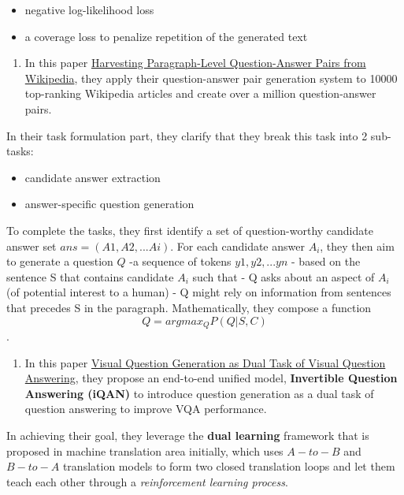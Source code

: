 \documentclass{acm_proc_article-sp}
\providecommand{\tightlist}{%
  \setlength{\itemsep}{0pt}\setlength{\parskip}{0pt}}
\begin{document}
\begin{itemize}
\tightlist
\item
  negative log-likelihood loss
\item
  a coverage loss to penalize repetition of the generated text
\end{itemize}

\begin{enumerate}
\def\labelenumi{\arabic{enumi}.}
\setcounter{enumi}{1}
\tightlist
\item
  In this paper \href{https://arxiv.org/pdf/1805.05942.pdf}{Harvesting
  Paragraph-Level Question-Answer Pairs from Wikipedia}, they apply
  their question-answer pair generation system to 10000 top-ranking
  Wikipedia articles and create over a million question-answer pairs.
\end{enumerate}

In their task formulation part, they clarify that they break this task
into 2 sub-tasks:

\begin{itemize}
\tightlist
\item
  candidate answer extraction
\item
  answer-specific question generation
\end{itemize}

To complete the tasks, they first identify a set of question-worthy
candidate answer set \(ans = (A1, A2,...Ai)\). For each candidate answer
\(A_i\), they then aim to generate a question \(Q\) -a sequence of
tokens \({y1,y2,...yn}\) - based on the sentence S that contains
candidate \(A_i\) such that - Q asks about an aspect of \(A_i\) (of
potential interest to a human) - Q might rely on information from
sentences that precedes S in the paragraph. Mathematically, they compose
a function \[Q = argmax_Q P(Q|S,C)\].

\begin{enumerate}
\def\labelenumi{\arabic{enumi}.}
\setcounter{enumi}{2}
\tightlist
\item
  In this paper
  \href{http://cvboy.com/pdf/publications/cvpr2018_iqan.pdf}{Visual
  Question Generation as Dual Task of Visual Question Answering}, they
  propose an end-to-end unified model, \textbf{Invertible Question
  Answering (iQAN)} to introduce question generation as a dual task of
  question answering to improve VQA performance.
\end{enumerate}

In achieving their goal, they leverage the \textbf{dual learning}
framework that is proposed in machine translation area initially, which
uses \(A-to-B\) and \(B-to-A\) translation models to form two closed
translation loops and let them teach each other through a
\emph{reinforcement learning process}.
\end{document}
